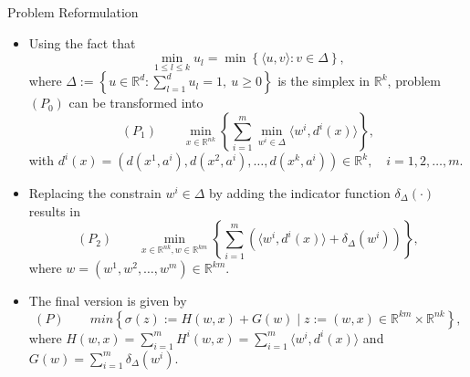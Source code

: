 \documentclass[9pt,handout]{beamer} %
\newcommand{\R}{\mathbb{R}} %
\begin{document}
    \begin{frame}{Problem Reformulation}
	    \begin{itemize}[<+->]
	    	\item Using the fact that
				\begin{equation*}
					\min\limits_{1 \leq l \leq k} u_l = \min \left\lbrace \langle u,v \rangle : v \in \Delta \right\rbrace ,
				\end{equation*}
				where $\Delta := \left\lbrace u \in \mathbb{R}^d : \sum\limits_{l=1}^{d} u_l = 1, \: u \geq 0 \right\rbrace$ is the simplex in $\R^k$, problem $(P_0)$ can be transformed into
				\begin{equation*}
					(P_1) \qquad \min\limits_{x \in \R^{nk}} \left\{ \sum\limits_{i=1}^{m} \min\limits_{w^i \in \Delta} \langle w^i , d^i(x) \rangle \right\},
				\end{equation*}
				with $d^{i}(x) = (d(x^1,a^i), d(x^2,a^i), \ldots , d(x^k,a^i)) \in \mathbb{R}^k, \quad i=1, 2, \ldots , m$.
			\item Replacing the constrain $w^i \in \Delta$ by adding the indicator function $\delta_{\Delta}(\cdot)$ results in
				\begin{equation*}
					(P_2) \qquad \min\limits_{x \in \mathbb{R}^{nk} , w \in \mathbb{R}^{km}} \left\lbrace \sum\limits_{i=1}^{m} \left( \langle w^i , d^i(x) \rangle + \delta_{\Delta}(w^i) \right) \right\rbrace,
				\end{equation*}
				where $w = (w^1, w^2, \ldots , w^m) \in \R^{km}$.
			\item The final version is given by
				\begin{equation*}
					(P) \qquad min \left\lbrace \sigma(z) := H(w,x) + G(w) \mid z := (w,x) \in \R^{km} \times \R^{nk} \right\rbrace, 
				\end{equation*}
				where $H(w,x) = \sum\limits_{i=1}^{m} H^i(w,x) = \sum\limits_{i=1}^{m} \langle w^i , d^i(x) \rangle$ and $G(w) = \sum\limits_{i=1}^{m} \delta_{\Delta}(w^i).$
		\end{itemize}
    \end{frame}
    
\end{document}
